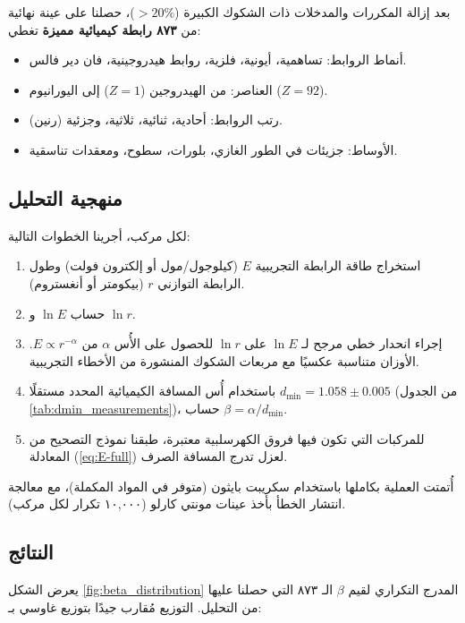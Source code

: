 \documentclass[12pt,a4paper]{article}
\theoremstyle{remark}
\begin{document}
	بعد إزالة المكررات والمدخلات ذات الشكوك الكبيرة (\(>20\%\))، حصلنا على عينة نهائية من \textbf{٨٧٣ رابطة كيميائية مميزة} تغطي:
	\begin{itemize}
		\item أنماط الروابط: تساهمية، أيونية، فلزية، روابط هيدروجينية، فان دير فالس.
		\item العناصر: من الهيدروجين (\(Z=1\)) إلى اليورانيوم (\(Z=92\)).
		\item رتب الروابط: أحادية، ثنائية، ثلاثية، وجزئية (رنين).
		\item الأوساط: جزيئات في الطور الغازي، بلورات، سطوح، ومعقدات تناسقية.
	\end{itemize}
	
	\subsection{منهجية التحليل}
	
	لكل مركب، أجرينا الخطوات التالية:
	
	\begin{enumerate}
		\item استخراج طاقة الرابطة التجريبية \(E\) (كيلوجول/مول أو إلكترون فولت) وطول الرابطة التوازني \(r\) (بيكومتر أو أنغستروم).
		\item حساب \(\ln E\) و \(\ln r\).
		\item إجراء انحدار خطي مرجح لـ \(\ln E\) على \(\ln r\) للحصول على الأُس \(\alpha\) من \(E \propto r^{-\alpha}\). الأوزان متناسبة عكسيًا مع مربعات الشكوك المنشورة من الأخطاء التجريبية.
		\item باستخدام أُس المسافة الكيميائية المحدد مستقلًا \(d_{\text{min}} = 1.058 \pm 0.005\) (من الجدول \ref{tab:dmin_measurements})، حساب \(\beta = \alpha / d_{\text{min}}\).
		\item للمركبات التي تكون فيها فروق الكهرسلبية معتبرة، طبقنا نموذج التصحيح من المعادلة (\ref{eq:E-full}) لعزل تدرج المسافة الصرف.
	\end{enumerate}
	
	أُتمتت العملية بكاملها باستخدام سكريبت بايثون (متوفر في المواد المكملة)، مع معالجة انتشار الخطأ بأخذ عينات مونتي كارلو (١٠,٠٠٠ تكرار لكل مركب).
	
	\subsection{النتائج}
	
	يعرض الشكل \ref{fig:beta_distribution} المدرج التكراري لقيم \(\beta\) الـ ٨٧٣ التي حصلنا عليها من التحليل. التوزيع مُقارب جيدًا بتوزيع غاوسي بـ:
	
\end{document}
